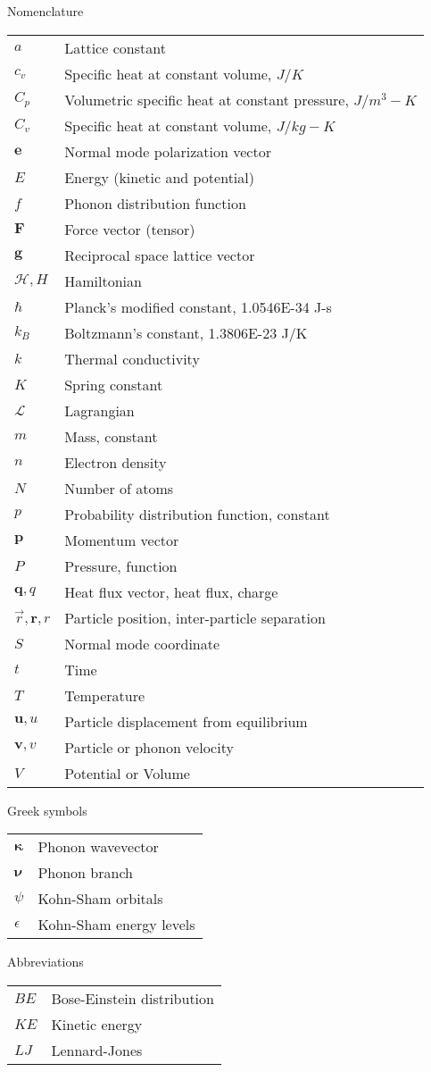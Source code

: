 Nomenclature\\
\begin{longtable}{ l l }
$a$ & Lattice constant \\
$c_v$ & Specific heat at constant volume, $J/K$\\
$C_p$ & Volumetric specific heat at constant pressure, $J/m^3-K$\\
$C_v$ & Specific heat at constant volume, $J/kg-K$\\
$\textbf{e}$ & Normal mode polarization vector\\
$E$ & Energy (kinetic and potential)\\
$f$ & Phonon distribution function\\
$\textbf{F}$ & Force vector (tensor)\\
$\textbf{g}$ & Reciprocal space lattice vector\\
$\mathscr{H}, H$ & Hamiltonian \\
$\hbar$ & Planck's modified constant, 1.0546E-34 J-s\\
$k_B$ & Boltzmann's constant, 1.3806E-23 J/K\\
$k$ & Thermal conductivity\\
$K$ & Spring constant\\
$\mathscr{L}$ & Lagrangian \\
$m$ & Mass, constant\\
$n$ & Electron density\\
$N$ & Number of atoms\\
$p$ & Probability distribution function, constant\\
$\textbf{p}$ & Momentum vector\\
$P$ & Pressure, function\\
$\textbf{q},q$ & Heat flux vector, heat flux, charge\\
$\vec{r},\textbf{r},r$ & Particle position, inter-particle separation\\
$S$ & Normal mode coordinate\\
$t$ & Time\\
$T$ & Temperature\\
$\textbf{u},u$ & Particle displacement from equilibrium\\
$\textbf{v},v$ & Particle or phonon velocity\\
$V$ & Potential or Volume\\
\end{longtable}

Greek symbols\\
\begin{longtable}{ l l }
$\pmb{\kappa}$ & Phonon wavevector\\ 
$\pmb{\nu}$ & Phonon branch\\
$\psi$ & Kohn-Sham orbitals\\
$\epsilon$ & Kohn-Sham energy levels\\
\end{longtable}

Abbreviations\\
\begin{longtable}{ l l }
$BE$ & Bose-Einstein distribution \\
$KE$ & Kinetic energy\\
$LJ$ & Lennard-Jones\\
\end{longtable}
